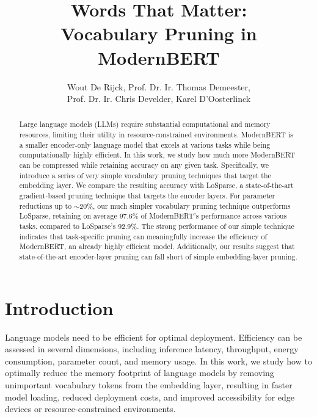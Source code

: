 \documentclass[twocolumn]{article}
\title{\huge \textbf{Words That Matter:\\ Vocabulary Pruning in ModernBERT}}
\author{Wout De Rijck, Prof. Dr. Ir. Thomas Demeester, \\ Prof. Dr. Ir. Chris Develder, Karel D'Oosterlinck}
\date{} %
\begin{document}
\maketitle

\begin{abstract}

Large language models (LLMs) require substantial computational and memory resources, limiting their utility in resource-constrained environments. 
ModernBERT is a smaller encoder-only language model that excels at various tasks while being computationally highly efficient. 
In this work, we study how much more ModernBERT can be compressed while retaining accuracy on any given task.
Specifically, we introduce a series of very simple vocabulary pruning techniques that target the embedding layer. We compare the resulting accuracy with LoSparse, a state-of-the-art gradient-based pruning technique that targets the encoder layers.
For parameter reductions up to $\sim$20\%, our much simpler vocabulary pruning technique outperforms LoSparse, retaining on average 97.6\% of ModernBERT's performance across various tasks, compared to LoSparse's 92.9\%.
The strong performance of our simple technique indicates that task-specific pruning can meaningfully increase the efficiency of ModernBERT, an already highly efficient model. Additionally, our results suggest that state-of-the-art encoder-layer pruning can fall short of simple embedding-layer pruning.

\end{abstract}

\section{Introduction}
Language models need to be efficient for optimal deployment.
Efficiency can be assessed in several dimensions, including inference latency, throughput, energy consumption, parameter count, and memory usage.
In this work, we study how to optimally reduce the memory footprint of language models by removing unimportant vocabulary tokens from the embedding layer, resulting in faster model loading, reduced deployment costs, and improved accessibility for edge devices or resource-constrained environments.
\end{document}
